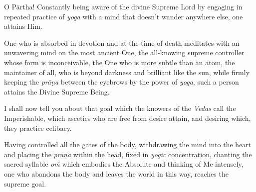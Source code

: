 {O Pārtha! Constantly being aware of the divine Supreme Lord by engaging in repeated practice of \textit{yoga} with a mind that doesn't wander anywhere else, one attains Him.}

{One who is absorbed in devotion and at the time of death meditates with an unwavering mind on the most ancient One, the all-knowing supreme controller whose form is inconceivable, the One who is more subtle than an atom, the maintainer of all, who is beyond darkness and brilliant like the sun, while firmly keeping the \textit{prāṇa} between the eyebrows by the power of \textit{yoga}, such a person attains the Divine Supreme Being.}

{I shall now tell you about that goal which the knowers of the \textit{Vedas} call the Imperishable, which ascetics who are free from desire attain, and desiring which, they practice celibacy.}

{Having controlled all the gates of the body, withdrawing the mind into the heart and placing the \textit{prāṇa} within the head, fixed in \textit{yogic} concentration, chanting the sacred syllable \textit{oṁ} which embodies the Absolute and thinking of Me intensely, one who abandons the body and leaves the world in this way, reaches the supreme goal.}

